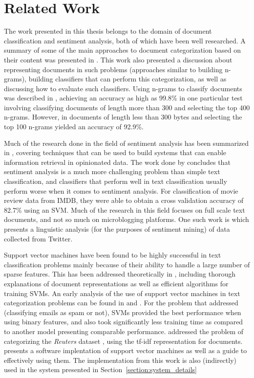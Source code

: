 \chapter{Related Work}
\label{chapter:Related Work}

The work presented in this thesis belongs to the domain of document classification and sentiment analysis, both of which have been well researched. A summary of some of the main approaches to document categorization based on their content was presented in \cite{sebastiani2002machine}. This work also presented a discussion about representing documents in such problems (approaches similar to building n-grams), building classifiers that can perform this categorization, as well as discussing how to evaluate such classifiers. Using n-grams to classify documents was described in \cite{cavnar1994n}, achieving an accuracy as high as 99.8\% in one particular test involving classifying documents of length more than 300 and selecting the top 400 n-grams. However, in documents of length less than 300 bytes and selecting the top 100 n-grams yielded an accuracy of 92.9\%.

Much of the research done in the field of sentiment analysis has been summarized in \cite{pang2008opinion}, covering techniques that can be used to build systems that can enable information retrieval in opinionated data. The work done by \cite{pang2002thumbs} concludes that sentiment analysis is a much more challenging problem than simple text classification, and classifiers that perform well in text classification usually perform worse when it comes to sentiment analysis. For classification of movie review data from IMDB, they were able to obtain a cross validation accuracy of 82.7\% using an SVM. Much of the research in this field focuses on full scale text documents, and not so much on microblogging platforms. One such work is \cite{pak2010twitter} which presents a linguistic analysis (for the purposes of sentiment mining) of data collected from Twitter.

Support vector machines have been found to be highly successful in text classification problems mainly because of their ability to handle a large number of sparse features. This has been addressed theoretically in \cite{joachims2002learning}, including thorough explanations of document representations as well as efficient algorithms for training SVMs. An early analysis of the use of support vector machines in text categorization problems can be found in \cite{joachims1998text} and \cite{drucker1999support}. For the problem that \cite{drucker1999support} addressed (classifying emails as spam or not), SVMs provided the best performance when using binary features, and also took significantly less training time as compared to another model presenting comparable performance. \cite{manevitz2002one} addressed the problem of categorizing the \emph{Reuters} dataset \cite{reuters}, using the tf-idf representation for documents. \cite{hsu2003practical} presents a software implentation of support vector machines as well as a guide to effectively using them. The implementation from this work is also (indirectly) used in the system presented in Section~\ref{section:system_details}

